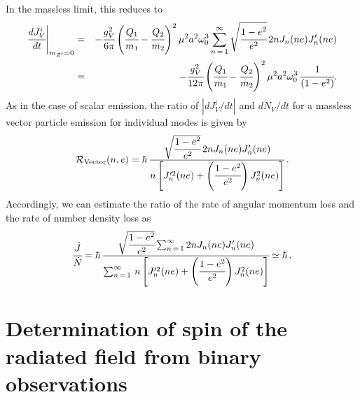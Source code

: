 \documentclass[aps,prd]{revtex4-2}
\begin{document}
In the massless limit, this reduces to 
\begin{eqnarray}
    \cfrac{dJ_{V}^{i}}{dt}\Bigg|_{m_{Z^{\prime}}=0} &=& -\cfrac{g_{V}^2}{6\pi} \left(\cfrac{Q_{1}}{m_{1}} - \cfrac{Q_{2}}{m_{2}}\right)^{2} \mu^{2} a^{2} \omega_{0}^{3} \sum_{n\,=\,1}^{\infty} \sqrt{\cfrac{1-e^2}{e^2}}\,2n J_{n}(ne) J_{n}^{\prime}(ne)\nonumber \\
    &=& -\cfrac{g_{V}^2}{12\pi} \left(\cfrac{Q_{1}}{m_{1}} - \cfrac{Q_{2}}{m_{2}}\right)^{2} \mu^{2} a^{2} \omega_{0}^{3}\,\cfrac{1}{(1-e^2)}.
\end{eqnarray}
As in the case of scalar emission, the ratio of $|dJ_{V}^{i}/dt|$ and $dN_{V}/dt$ for a massless vector particle emission for individual modes is given by
\begin{eqnarray}
    \mathcal{R}_{\rm Vector} (n, e) = \hbar\, \cfrac{\sqrt{\cfrac{1-e^2}{e^2}}\,2n J_{n}(ne) J_{n}^{\prime}(ne)}{n\left[J_{n}^{\prime 2}(ne) + \left(\cfrac{1-e^2}{e^2}\right) J_{n}^{2}(ne)\right]}\,.
\end{eqnarray}
Accordingly, we can estimate the ratio of the rate of angular momentum loss and the rate of number density loss as 
\begin{eqnarray}\label{Eq:ratio_j_n_vector}
    \cfrac{\dot{J}}{\dot{N}}=\hbar\, \cfrac{\sqrt{\cfrac{1-e^2}{e^2}} \sum_{n\,=\,1}^{\infty} 2 n J_{n}(ne) J_{n}^{\prime}(ne)}{\sum_{n\,=\,1}^{\infty}\,n\left[J_{n}^{\prime 2}(ne) + \left(\cfrac{1-e^2}{e^2}\right) J_{n}^{2}(ne)\right]}\simeq \hbar\,.
\end{eqnarray}

\section{Determination of spin of the radiated field from binary observations}\label{Sec:spin_determination}
\end{document}
